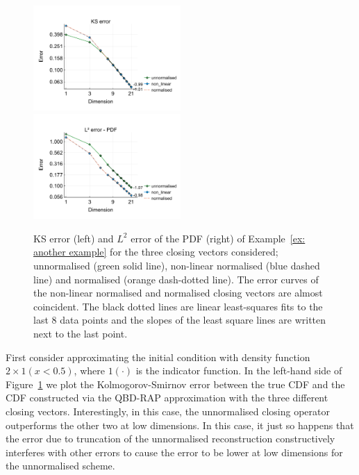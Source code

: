 \begin{example}\label{ex: another example}
	\begin{figure}[h]
		\centering
		\includegraphics[width=0.5\textwidth,trim={0.5cm 0.8cm 0.2cm 1.25cm},clip]{chapter6/figs/qbdrap_closing_vec/fun2/ks_error_formatted.pdf}%
		\includegraphics[width=0.5\textwidth,trim={0.5cm 0.8cm 0.2cm 1.25cm},clip]{chapter6/figs/qbdrap_closing_vec/fun2/l2_pdf_error_formatted.pdf}
		\caption{KS error (left) and \(L^2\) error of the PDF (right) of Example~\ref{ex: another example} for the three closing vectors considered; unnormalised (green solid line), non-linear normalised (blue dashed line) and normalised (orange dash-dotted line). The error curves of the non-linear normalised and normalised closing vectors are almost coincident. The black dotted lines are linear least-squares fits to the last 8 data points and the slopes of the least square lines are written next to the last point.}%
		\label{fig: fun 2 ks error qbdrap closing vecs}
	\end{figure} 
	First consider approximating the initial condition with density function \(2\times 1(x<0.5)\), where \(1(\cdot)\) is the indicator function. In the left-hand side of Figure~\ref{fig: fun 2 ks error qbdrap closing vecs} we plot the Kolmogorov-Smirnov error between the true CDF and the CDF constructed via the QBD-RAP approximation with the three different closing vectors. Interestingly, in this case, the unnormalised closing operator outperforms the other two at low dimensions. In this case, it just so happens that the error due to truncation of the unnormalised reconstruction constructively interferes with other errors to cause the error to be lower at low dimensions for the unnormalised scheme. 
	

\end{example}
